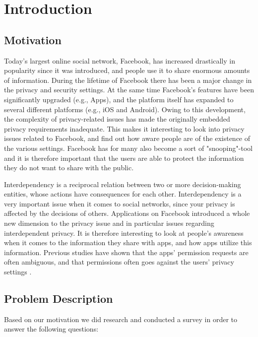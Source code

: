 \chapter{Introduction}
\label{chp:introduction} 

\section{Motivation}
Today's largest online social network, Facebook, has increased drastically in popularity since it was introduced, and people use it to share enormous amounts of information. During the lifetime of Facebook there has been a major change in the privacy and security settings. At the same time Facebook's features have been significantly upgraded (e.g., Apps), and the platform itself has expanded to several different platforms (e.g., iOS and Android). Owing to this development, the complexity of privacy-related issues has made the originally embedded privacy requirements inadequate. This makes it interesting to look into privacy issues related to Facebook, and find out how aware people are of the existence of the various settings. Facebook has for many also become a sort of "snooping"-tool and it is therefore important that the users are able to protect the information they do not want to share with the public.

Interdependency is a reciprocal relation between two or more decision-making entities, whose actions have consequences for each other. Interdependency is a very important issue when it comes to social networks, since your privacy is affected by the decisions of others. Applications on Facebook introduced a whole new dimension to the privacy issue and in particular issues regarding interdependent privacy. It is therefore interesting to look at people's awareness when it comes to the information they share with apps, and how apps utilize this information. Previous studies have shown that the apps' permission requests are often ambiguous, and that permissions often goes against the users' privacy settings \cite{thirdPartyApps}.  


\section{Problem Description}
Based on our motivation we did research and conducted a survey in order to answer the following questions: 

